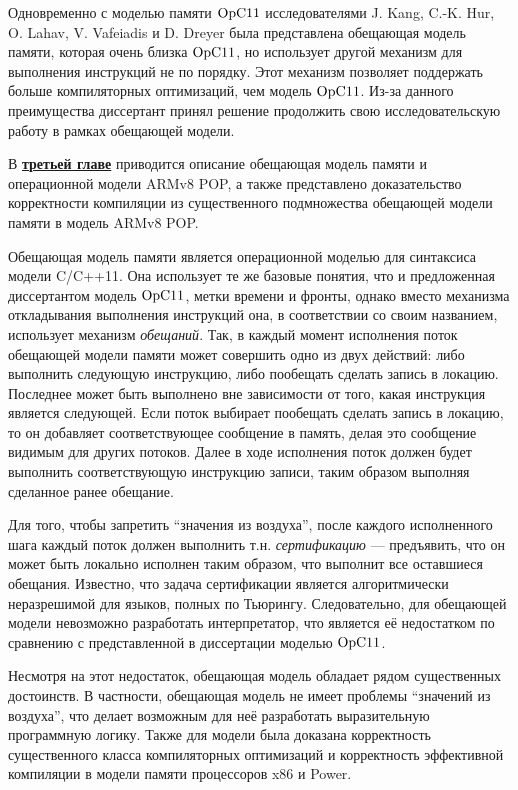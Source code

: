 Одновременно с моделью памяти $\mathrm{OpC11}$ исследователями J. Kang, C.-K. Hur, O. Lahav, V. Vafeiadis и D. Dreyer была представлена обещающая модель
памяти, которая очень близка $\mathrm{OpC11}$, но использует другой механизм для выполнения инструкций не по порядку.
Этот механизм позволяет поддержать больше компиляторных оптимизаций, чем модель $\mathrm{OpC11}$.
Из-за данного преимущества диссертант принял решение продолжить свою исследовательскую работу в рамках обещающей модели.

В \underline{\textbf{третьей главе}} приводится описание обещающая модель памяти и операционной модели ARMv8 POP,
а также представлено доказательство
корректности компиляции из существенного подмножества обещающей модели памяти в модель ARMv8 POP.

Обещающая модель памяти является операционной моделью для синтаксиса модели C/C++11.
Она использует те же базовые понятия, что и предложенная диссертантом модель $\mathrm{OpC11}$,
метки времени и фронты, однако вместо механизма откладывания выполнения инструкций она,
в соответствии со своим названием, использует механизм \emph{обещаний}. Так, в каждый момент исполнения поток
обещающей модели памяти может совершить одно из двух действий: либо выполнить следующую инструкцию,
либо пообещать сделать запись в локацию. Последнее может быть выполнено вне зависимости от того, какая
инструкция является следующей.
Если поток выбирает пообещать сделать запись в локацию, то он добавляет соответствующее сообщение в память,
делая это сообщение видимым для других потоков. Далее в ходе исполнения поток должен будет выполнить соответствующую инструкцию записи, таким образом выполняя сделанное ранее обещание.

Для того, чтобы запретить ``значения из воздуха'', после каждого исполненного шага каждый поток должен выполнить
т.н. \emph{сертификацию} --- предъявить, что он может быть локально исполнен таким образом, что
выполнит все оставшиеся обещания. Известно, что задача сертификации является алгоритмически неразрешимой для языков,
 полных по Тьюрингу. Следовательно, для
обещающей модели невозможно разработать интерпретатор, что является её недостатком по сравнению с представленной в
диссертации моделью $\mathrm{OpC11}$.

Несмотря на этот недостаток, обещающая модель обладает рядом существенных достоинств.
В частности, обещающая модель не имеет проблемы ``значений из воздуха'', что делает возможным для неё разработать
выразительную программную логику. Также для модели была доказана корректность существенного класса компиляторных
оптимизаций и корректность эффективной компиляции в модели памяти процессоров x86 и Power.

